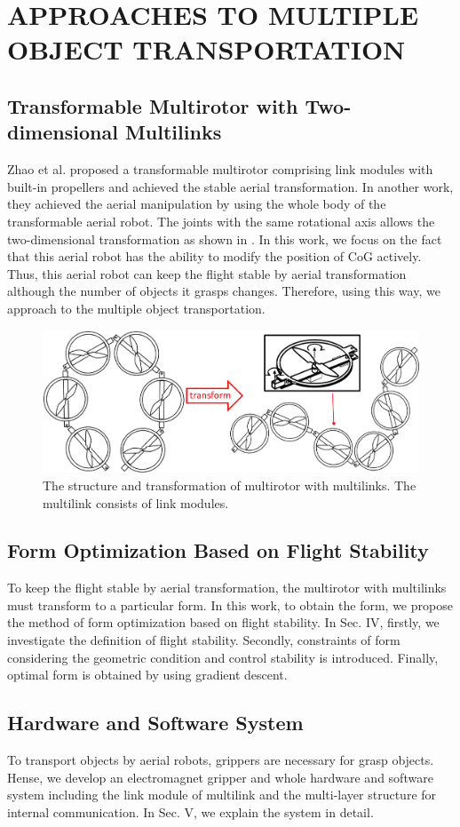\section{APPROACHES TO MULTIPLE OBJECT TRANSPORTATION}
\subsection{Transformable Multirotor with Two-dimensional Multilinks}
Zhao et al.\cite{Zhao2016} proposed a transformable multirotor comprising link modules with built-in propellers and achieved the stable aerial transformation. In another work\cite{ZhaoICRA2017}, they achieved the aerial manipulation by using the whole body of the transformable aerial robot. The joints with the same rotational axis allows the two-dimensional transformation as shown in . In this work, we focus on the fact that this aerial robot has the ability to modify the position of CoG actively. Thus, this aerial robot can keep the flight stable by aerial transformation although the number of objects it grasps changes. Therefore, using this way, we approach to the multiple object transportation.
\begin{figure}[t]
  \begin{center}
    \includegraphics[width=1.0\columnwidth]{figs/multilink.pdf}
  \end{center}
  \caption{The structure and transformation of multirotor with multilinks. The multilink consists of link modules.\label{figure:multi_link}}
\end{figure}
 
\subsection{Form Optimization Based on Flight Stability}
To keep the flight stable by aerial transformation, the multirotor with multilinks must transform to a particular form. In this work, to obtain the form, we propose the method of form optimization based on flight stability. In Sec. IV, firstly, we investigate the definition of flight stability. Secondly, constraints of form considering the geometric condition and control stability is introduced. Finally, optimal form is obtained by using gradient descent.
  
\subsection{Hardware and Software System}
To transport objects by aerial robots, grippers are necessary for grasp objects. Hense, we develop an electromagnet gripper and whole hardware and software system including the link module of multilink and the multi-layer structure for internal communication. In Sec. V, we explain the system in detail.
